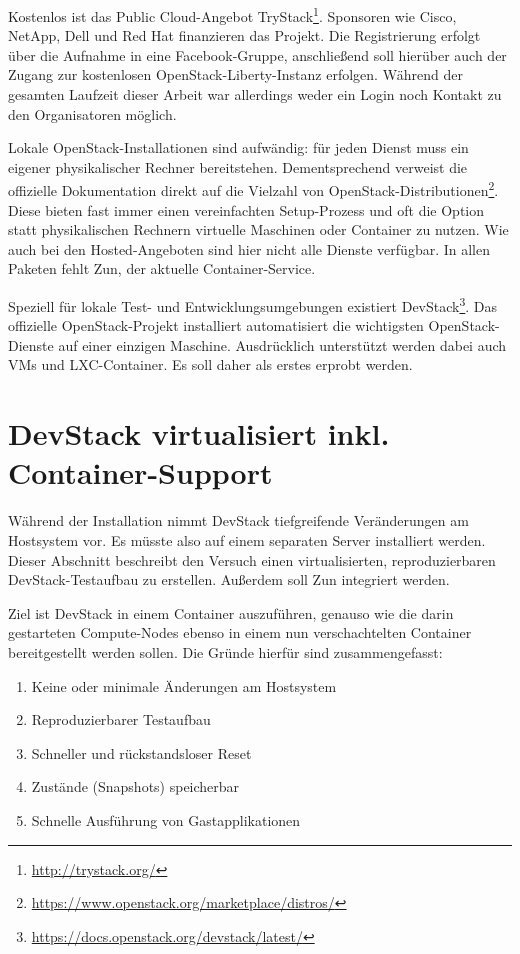 Kostenlos ist das Public Cloud-Angebot TryStack\footnote{\url{http://trystack.org/}}. Sponsoren wie Cisco, \mbox{NetApp}, Dell und Red Hat finanzieren das Projekt. Die Registrierung erfolgt über die Aufnahme in eine Facebook-Gruppe, anschließend soll hierüber auch der Zugang zur kostenlosen OpenStack-Liberty-Instanz erfolgen. Während der gesamten Laufzeit dieser Arbeit war allerdings weder ein Login noch Kontakt zu den Organisatoren möglich.

Lokale OpenStack-Installationen sind aufwändig: für jeden Dienst muss ein eigener physikalischer Rechner bereitstehen. Dementsprechend verweist die offizielle Dokumentation direkt auf die Vielzahl von OpenStack-Distributionen\footnote{\url{https://www.openstack.org/marketplace/distros/}}. Diese bieten fast immer einen vereinfachten Setup-Prozess und oft die Option statt physikalischen Rechnern virtuelle Maschinen oder Container zu nutzen. Wie auch bei den Hosted-Angeboten sind hier nicht alle Dienste verfügbar. In allen Paketen fehlt Zun, der aktuelle Container-Service.

Speziell für lokale Test- und Entwicklungsumgebungen existiert DevStack\footnote{\url{https://docs.openstack.org/devstack/latest/}}. Das offizielle OpenStack-Projekt installiert automatisiert die wichtigsten OpenStack-Dienste auf einer einzigen Maschine. Ausdrücklich unterstützt werden dabei auch VMs und LXC-Container. Es soll daher als erstes erprobt werden.


\section{DevStack virtualisiert inkl. Container-Support}

Während der Installation nimmt DevStack tiefgreifende Veränderungen am Hostsystem vor. Es müsste also auf einem separaten Server installiert werden. Dieser Abschnitt beschreibt den Versuch einen virtualisierten, reproduzierbaren DevStack-Testaufbau zu erstellen. Außerdem soll Zun integriert werden. 

Ziel ist DevStack in einem Container auszuführen, genauso wie die darin gestarteten Compute-Nodes ebenso in einem nun verschachtelten Container bereitgestellt werden sollen. Die Gründe hierfür sind zusammengefasst:

\begin{enumerate}
	\item Keine oder minimale Änderungen am Hostsystem
	\item Reproduzierbarer Testaufbau
	\item Schneller und rückstandsloser Reset
	\item Zustände (Snapshots) speicherbar
	\item Schnelle Ausführung von Gastapplikationen
\end{enumerate}

